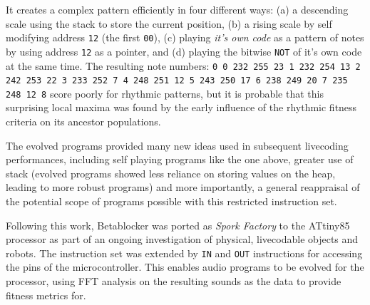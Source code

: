 \documentclass[letterpaper, 12pt]{article}
\begin{document}
It creates a complex pattern efficiently in four different ways:
 (a) a descending scale using the stack to store the current position,
 (b) a rising scale by self modifying address \texttt{12} (the first \texttt{00}),
 (c) playing \emph{it's own code} as a pattern of notes by using address \texttt{12} as a pointer, and
 (d) playing the bitwise \texttt{NOT} of it's own code at the same time.
% 
% 
The resulting note numbers: \texttt{0 0 232 255 23 1 232 254 13 2 242 253 22 3 233 252 7 4 248 251 12 5 243 250 17 6 238 249 20 7 235 248 12 8} score poorly for rhythmic patterns, but it is probable that this surprising local maxima was found by the early influence of the rhythmic fitness criteria on its ancestor populations. 

The evolved programs provided many new ideas used in subsequent livecoding performances,  including self playing programs like the one above, greater use of stack (evolved programs showed less reliance on storing values on the heap, leading to more robust programs) and more importantly, a general reappraisal of the potential scope of programs possible with this restricted instruction set.

Following this work, Betablocker was ported as \emph{Spork Factory} to the ATtiny85 processor as part of an ongoing investigation of physical, livecodable objects and robots. 
The instruction set was extended by \texttt{IN} and \texttt{OUT} instructions for accessing the pins of the microcontroller. 
This enables audio programs to be evolved for the processor, using FFT analysis on the resulting sounds as the data to provide fitness metrics for.
\parskip 18pt
\end{document}
